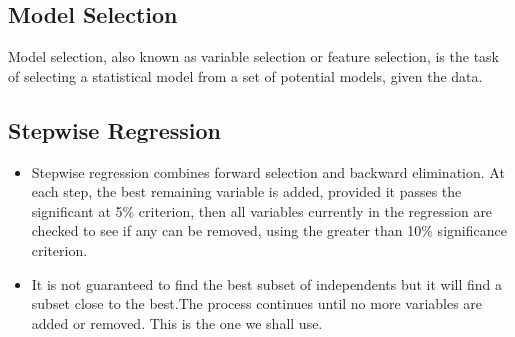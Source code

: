 \documentclass[a4paper,12pt]{article}
\begin{document}
%

%
%
%
%


\subsection{Model Selection}

Model selection, also known as variable selection or feature selection, is the task of selecting a statistical model from a set of potential models, given the data.




\subsection{Stepwise Regression}

\begin{itemize}
	\item Stepwise regression combines forward selection and backward elimination. At each
	step, the best remaining variable is added, provided it passes the significant at 5\%
	criterion, then all variables currently in the regression are checked to see if any can be
	removed, using the greater than 10\% significance criterion.  
	\item It is not
	guaranteed to find the best subset of independents but it will find a subset close to the
	best.The process continues
	until no more variables are added or removed. This is the one we shall use.
\end{itemize}
\end{document}
